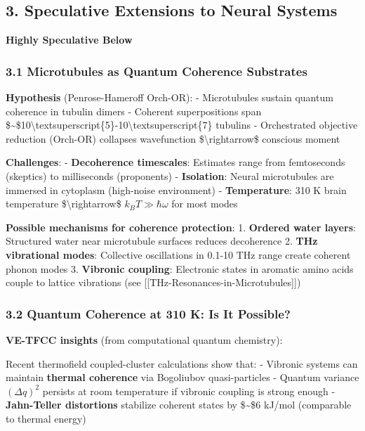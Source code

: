 \subsection{3. Speculative Extensions to Neural
Systems}\label{speculative-extensions-to-neural-systems}

\textbf{Highly Speculative Below}

\subsubsection{3.1 Microtubules as Quantum Coherence
Substrates}\label{microtubules-as-quantum-coherence-substrates}

\textbf{Hypothesis} (Penrose-Hameroff Orch-OR): - Microtubules sustain
quantum coherence in tubulin dimers - Coherent superpositions span
\$\sim\$10\textbackslash textsuperscript\{5\}-10\textbackslash textsuperscript\{7\}
tubulins - Orchestrated objective reduction (Orch-OR) collapses
wavefunction \$\textbackslash rightarrow\$ conscious moment

\textbf{Challenges}: - \textbf{Decoherence timescales}: Estimates range
from femtoseconds (skeptics) to milliseconds (proponents) -
\textbf{Isolation}: Neural microtubules are immersed in cytoplasm
(high-noise environment) - \textbf{Temperature}: 310 K brain temperature
\$\textbackslash rightarrow\$ \(k_B T \gg \hbar \omega\) for most modes

\textbf{Possible mechanisms for coherence protection}: 1.
\textbf{Ordered water layers}: Structured water near microtubule
surfaces reduces decoherence 2. \textbf{THz vibrational modes}:
Collective oscillations in 0.1-10 THz range create coherent phonon modes
3. \textbf{Vibronic coupling}: Electronic states in aromatic amino acids
couple to lattice vibrations (see
{[}{[}THz-Resonances-in-Microtubules{]}{]})

\subsubsection{3.2 Quantum Coherence at 310 K: Is It
Possible?}\label{quantum-coherence-at-310-k-is-it-possible}

\textbf{VE-TFCC insights} (from computational quantum chemistry):

Recent thermofield coupled-cluster calculations show that: - Vibronic
systems can maintain \textbf{thermal coherence} via Bogoliubov
quasi-particles - Quantum variance \((\Delta q)^2\) persists at room
temperature if vibronic coupling is strong enough - \textbf{Jahn-Teller
distortions} stabilize coherent states by \$\sim\$6 kJ/mol (comparable
to thermal energy)


